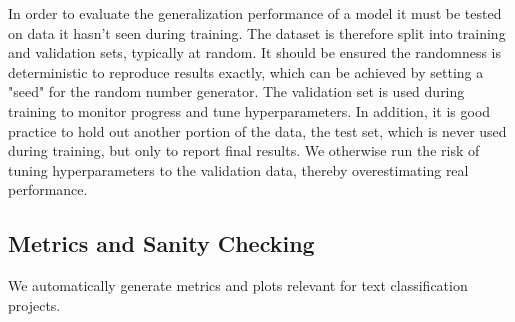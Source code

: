 In order to evaluate the generalization performance of a model it must be tested on data it hasn't seen during training.
The dataset is therefore split into training and validation sets, typically at random.
It should be ensured the randomness is deterministic to reproduce results exactly, which can be achieved by setting a "seed" for the random number generator.
The validation set is used during training to monitor progress and tune hyperparameters.
In addition, it is good practice to hold out another portion of the data, the test set, which is never used during training, but only to report final results.
We otherwise run the risk of tuning hyperparameters to the validation data, thereby overestimating real performance.

\subsection{Metrics and Sanity Checking}
\label{metrics_and_sanity_checking}
We automatically generate metrics and plots relevant for text classification projects.
